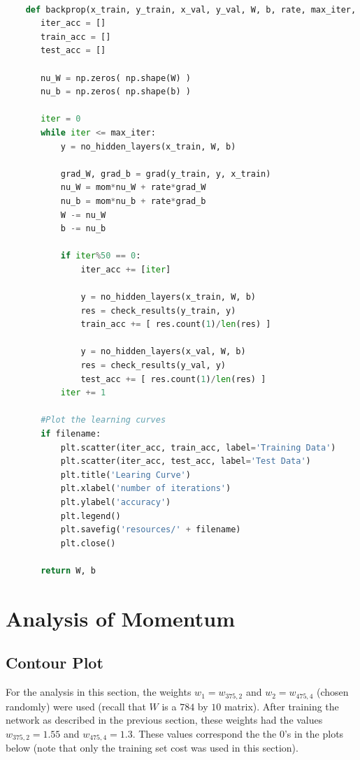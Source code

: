 \documentclass{article}
\begin{document}
  \begin{lstlisting}[language=Python]

    def backprop(x_train, y_train, x_val, y_val, W, b, rate, max_iter, mom=0, filename=''):
       iter_acc = []
       train_acc = []
       test_acc = []

       nu_W = np.zeros( np.shape(W) )
       nu_b = np.zeros( np.shape(b) )

       iter = 0
       while iter <= max_iter:
           y = no_hidden_layers(x_train, W, b)

           grad_W, grad_b = grad(y_train, y, x_train)
           nu_W = mom*nu_W + rate*grad_W
           nu_b = mom*nu_b + rate*grad_b
           W -= nu_W
           b -= nu_b

           if iter%50 == 0:
               iter_acc += [iter]

               y = no_hidden_layers(x_train, W, b)
               res = check_results(y_train, y)
               train_acc += [ res.count(1)/len(res) ]

               y = no_hidden_layers(x_val, W, b)
               res = check_results(y_val, y)
               test_acc += [ res.count(1)/len(res) ]
           iter += 1

       #Plot the learning curves
       if filename:
           plt.scatter(iter_acc, train_acc, label='Training Data')
           plt.scatter(iter_acc, test_acc, label='Test Data')
           plt.title('Learing Curve')
           plt.xlabel('number of iterations')
           plt.ylabel('accuracy')
           plt.legend()
           plt.savefig('resources/' + filename)
           plt.close()

       return W, b
   \end{lstlisting}






   \section{Analysis of Momentum}


   \subsection{Contour Plot}
   For the analysis in this section, the weights $w_1 = w_{375,2}$ and $w_2 = w_{475,4}$
   (chosen randomly) were used (recall that $W$ is
   a $784$ by $10$ matrix). After training the network as described in the previous section,
   these weights had the values $w_{375,2} = 1.55$ and $w_{475,4} = 1.3$. These values correspond the the
   $0$'s in the plots below (note that only the training set cost was used in this section).
\end{document}
